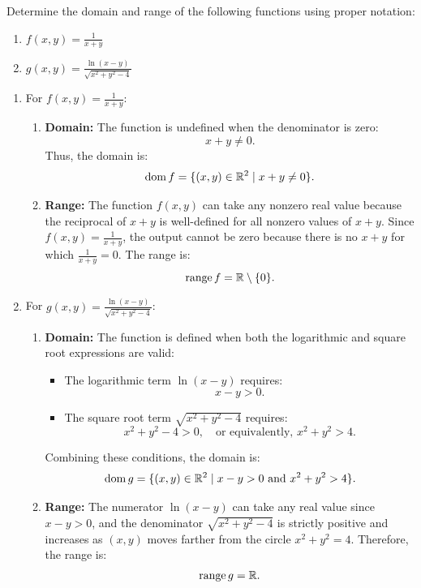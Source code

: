 \exampleline
\begin{example}
Determine the domain and range of the following functions using proper notation:
\begin{enumerate}
    \item \( f(x, y) = \frac{1}{x + y} \)
    \item \( g(x, y) = \frac{\ln(x - y)}{\sqrt{x^2 + y^2 - 4}} \)
\end{enumerate}


\begin{solution}
\begin{enumerate}
    \item For \( f(x, y) = \frac{1}{x + y} \):
    \begin{enumerate}
        \item \textbf{Domain:} The function is undefined when the denominator is zero:
        \[
        x + y \neq 0.
        \]
        Thus, the domain is:
        \[
        \mathrm{dom}\,f = \{(x, y) \in \mathbb{R}^2 \mid x + y \neq 0\}.
        \]
        \item \textbf{Range:} The function \( f(x, y) \) can take any nonzero real value because the reciprocal of \( x + y \) is well-defined for all nonzero values of \( x + y \). Since \( f(x, y) = \frac{1}{x + y} \), the output cannot be zero because there is no \( x + y \) for which \( \frac{1}{x + y} = 0 \). The range is:
        \[
        \mathrm{range}\, f = \mathbb{R} \setminus \{0\}.
        \]
    \end{enumerate}

    \item For \( g(x, y) = \frac{\ln(x - y)}{\sqrt{x^2 + y^2 - 4}} \):
    \begin{enumerate}
        \item \textbf{Domain:} The function is defined when both the logarithmic and square root expressions are valid:
        \begin{itemize}
            \item The logarithmic term \( \ln(x - y) \) requires:
            \[
            x - y > 0.
            \]
            \item The square root term \( \sqrt{x^2 + y^2 - 4} \) requires:
            \[
            x^2 + y^2 - 4 > 0, \quad \text{or equivalently, } x^2 + y^2 > 4.
            \]
        \end{itemize}
        Combining these conditions, the domain is:
        \[
        \mathrm{dom}\,g = \{(x, y) \in \mathbb{R}^2 \mid x - y > 0 \text{ and } x^2 + y^2 > 4\}.
        \]
        \item \textbf{Range:} The numerator \( \ln(x - y) \) can take any real value since \( x - y > 0 \), and the denominator \( \sqrt{x^2 + y^2 - 4} \) is strictly positive and increases as \( (x, y) \) moves farther from the circle \( x^2 + y^2 = 4 \). Therefore, the range is:
        \[
        \mathrm{range}\, g = \mathbb{R}.
        \]
    \end{enumerate}
\end{enumerate}
\end{solution}
\end{example}
\exampleline

